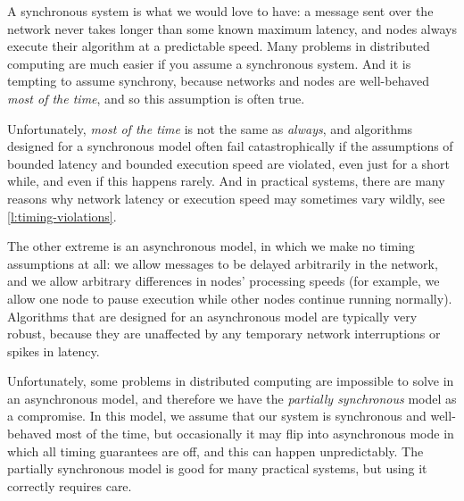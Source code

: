 A synchronous system is what we would love to have: a message sent over the network never takes longer than some known maximum latency, and nodes always execute their algorithm at a predictable speed.
Many problems in distributed computing are much easier if you assume a synchronous system.
And it is tempting to assume synchrony, because networks and nodes are well-behaved \emph{most of the time}, and so this assumption is often true.

Unfortunately, \emph{most of the time} is not the same as \emph{always}, and algorithms designed for a synchronous model often fail catastrophically if the assumptions of bounded latency and bounded execution speed are violated, even just for a short while, and even if this happens rarely.
And in practical systems, there are many reasons why network latency or execution speed may sometimes vary wildly, see \autoref{l:timing-violations}.

The other extreme is an asynchronous model, in which we make no timing assumptions at all: we allow messages to be delayed arbitrarily in the network, and we allow arbitrary differences in nodes' processing speeds (for example, we allow one node to pause execution while other nodes continue running normally).
Algorithms that are designed for an asynchronous model are typically very robust, because they are unaffected by any temporary network interruptions or spikes in latency.

Unfortunately, some problems in distributed computing are impossible to solve in an asynchronous model, and therefore we have the \emph{partially synchronous} model as a compromise.
In this model, we assume that our system is synchronous and well-behaved most of the time, but occasionally it may flip into asynchronous mode in which all timing guarantees are off, and this can happen unpredictably.
The partially synchronous model is good for many practical systems, but using it correctly requires care.


